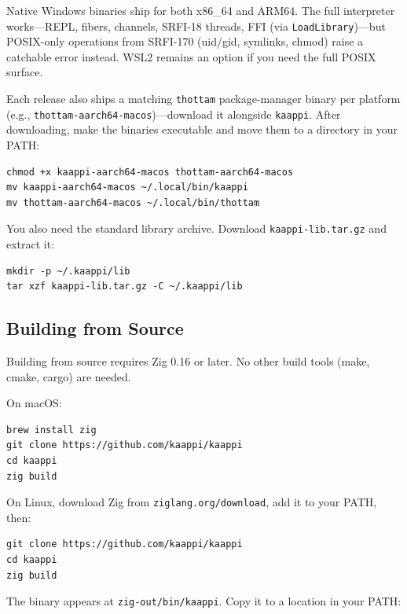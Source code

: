 \begin{note}[Windows]
Native Windows binaries ship for both x86\_64 and ARM64. The full interpreter works---REPL, fibers, channels, SRFI-18 threads, FFI (via \texttt{LoadLibrary})---but POSIX-only operations from SRFI-170 (uid/gid, symlinks, chmod) raise a catchable error instead. WSL2 remains an option if you need the full POSIX surface.
\end{note}

Each release also ships a matching \texttt{thottam} package-manager binary per platform (e.g., \texttt{thottam-aarch64-macos})---download it alongside \texttt{kaappi}. After downloading, make the binaries executable and move them to a directory in your PATH:

\begin{Verbatim}[fontsize=\small]
chmod +x kaappi-aarch64-macos thottam-aarch64-macos
mv kaappi-aarch64-macos ~/.local/bin/kaappi
mv thottam-aarch64-macos ~/.local/bin/thottam
\end{Verbatim}

You also need the standard library archive. Download \texttt{kaappi-lib.tar.gz} and extract it:

\begin{Verbatim}[fontsize=\small]
mkdir -p ~/.kaappi/lib
tar xzf kaappi-lib.tar.gz -C ~/.kaappi/lib
\end{Verbatim}

\subsection{Building from Source}

Building from source requires Zig 0.16 or later. No other build tools (make, cmake, cargo) are needed.

On macOS:

\begin{Verbatim}[fontsize=\small]
brew install zig
git clone https://github.com/kaappi/kaappi
cd kaappi
zig build
\end{Verbatim}

On Linux, download Zig from \texttt{ziglang.org/download}, add it to your PATH, then:

\begin{Verbatim}[fontsize=\small]
git clone https://github.com/kaappi/kaappi
cd kaappi
zig build
\end{Verbatim}

The binary appears at \texttt{zig-out/bin/kaappi}. Copy it to a location in your PATH:

